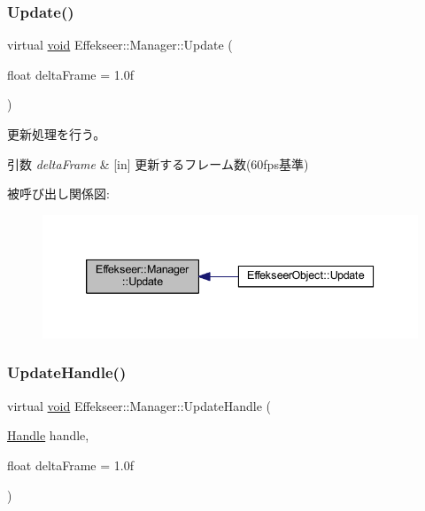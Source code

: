 \subsubsection{\texorpdfstring{Update()}{Update()}}
{\footnotesize\ttfamily virtual \mbox{\hyperlink{namespace_effekseer_ab34c4088e512200cf4c2716f168deb56}{void}} Effekseer\+::\+Manager\+::\+Update (\begin{DoxyParamCaption}\item[{float}]{delta\+Frame = {\ttfamily 1.0f} }\end{DoxyParamCaption})\hspace{0.3cm}{\ttfamily [pure virtual]}}



更新処理を行う。 


\begin{DoxyParams}{引数}
{\em delta\+Frame} & \mbox{[}in\mbox{]} 更新するフレーム数(60fps基準) \\
\hline
\end{DoxyParams}
被呼び出し関係図\+:\nopagebreak
\begin{figure}[H]
\begin{center}
\leavevmode
\includegraphics[width=339pt]{class_effekseer_1_1_manager_ac086ec64cb5f99172e8bf655b77e1464_icgraph}
\end{center}
\end{figure}
\mbox{\label{class_effekseer_1_1_manager_afe8a0df796e161f68a511540c76df839}} 
\subsubsection{\texorpdfstring{Update\+Handle()}{UpdateHandle()}}
{\footnotesize\ttfamily virtual \mbox{\hyperlink{namespace_effekseer_ab34c4088e512200cf4c2716f168deb56}{void}} Effekseer\+::\+Manager\+::\+Update\+Handle (\begin{DoxyParamCaption}\item[{\mbox{\hyperlink{namespace_effekseer_afba58b8d812da862190e9bbfc040824a}{Handle}}}]{handle,  }\item[{float}]{delta\+Frame = {\ttfamily 1.0f} }\end{DoxyParamCaption})\hspace{0.3cm}{\ttfamily [pure virtual]}}



